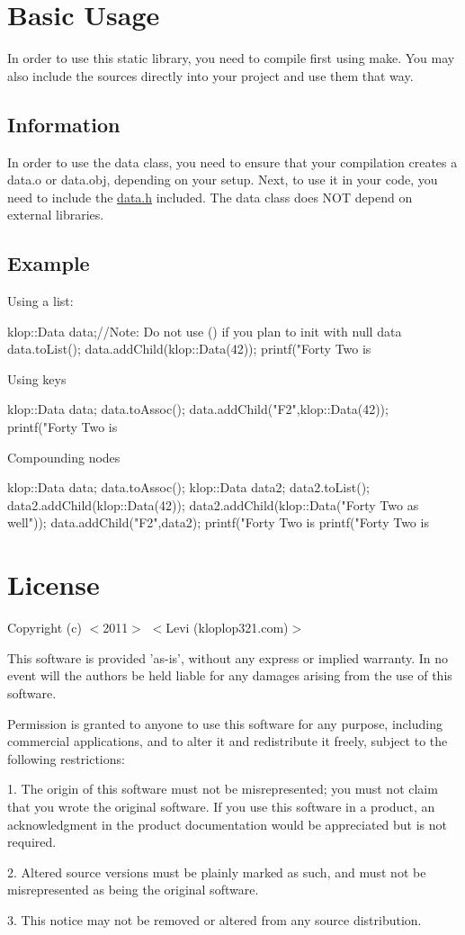 \hypertarget{index_usage}{}\section{Basic Usage}\label{index_usage}
In order to use this static library, you need to compile first using make. You may also include the sources directly into your project and use them that way. \hypertarget{index_basic_info}{}\subsection{Information}\label{index_basic_info}
In order to use the data class, you need to ensure that your compilation creates a data.o or data.obj, depending on your setup. Next, to use it in your code, you need to include the \hyperlink{data_8h}{data.h} included. The data class does NOT depend on external libraries.\hypertarget{index_syntax_example}{}\subsection{Example}\label{index_syntax_example}
Using a list: 
\begin{DoxyCode}
 klop::Data data;//Note: Do not use () if you plan to init with null data
 data.toList();
 data.addChild(klop::Data(42));
 printf("Forty Two is %
\end{DoxyCode}
 Using keys 
\begin{DoxyCode}
 klop::Data data;
 data.toAssoc();
 data.addChild("F2",klop::Data(42));
 printf("Forty Two is %
\end{DoxyCode}
 Compounding nodes 
\begin{DoxyCode}
 klop::Data data;
 data.toAssoc();
 klop::Data data2;
 data2.toList();
 data2.addChild(klop::Data(42));
 data2.addChild(klop::Data("Forty Two as well"));
 data.addChild("F2",data2);
 printf("Forty Two is %
 printf("Forty Two is %
\end{DoxyCode}
 \hypertarget{index_license}{}\section{License}\label{index_license}
Copyright (c) $<$2011$>$ $<$Levi (kloplop321.com)$>$

This software is provided 'as-\/is', without any express or implied warranty. In no event will the authors be held liable for any damages arising from the use of this software.

Permission is granted to anyone to use this software for any purpose, including commercial applications, and to alter it and redistribute it freely, subject to the following restrictions:

1. The origin of this software must not be misrepresented; you must not claim that you wrote the original software. If you use this software in a product, an acknowledgment in the product documentation would be appreciated but is not required.

2. Altered source versions must be plainly marked as such, and must not be misrepresented as being the original software.

3. This notice may not be removed or altered from any source distribution. 